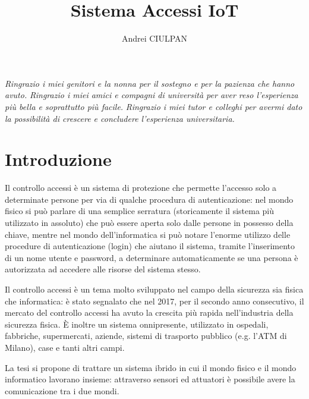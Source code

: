 \documentclass[12pt]{report}
\newcommand\blankpage{%
	\null
	\thispagestyle{empty}%
	\addtocounter{page}{-1}%
	\newpage}
\begin{document}
	

\title{Sistema Accessi IoT}
\author{Andrei CIULPAN}
\afterpage{\blankpage}
% 
%
\beforepreface

{\hfill \footnotesize {\sl Ringrazio i miei genitori e la nonna per il sostegno e per la pazienza che hanno avuto.}}
\vskip 0.8cm
{\hfill \footnotesize {\sl Ringrazio i miei amici e compagni di università per aver reso l'esperienza più bella e soprattutto più facile.}}
\vskip 0.8cm
{\hfill \footnotesize {\sl Ringrazio i miei tutor e colleghi per avermi dato la possibilità di crescere e concludere l'esperienza universitaria.}}

\afterpreface



\chapter{Introduzione}\label{cap:introduzione}
%

Il controllo accessi è un sistema di protezione che permette l'accesso solo a determinate persone per via di qualche procedura di autenticazione: nel mondo fisico si può parlare di una semplice serratura (storicamente il sistema più utilizzato in assoluto) che può essere aperta solo dalle persone in possesso della chiave, mentre nel mondo dell'informatica si può notare l'enorme utilizzo delle procedure di autenticazione (login) che aiutano il sistema, tramite l'inserimento di un nome utente e password, a determinare automaticamente se una persona è autorizzata ad accedere alle risorse del sistema stesso.

Il controllo accessi\cite{controllo_accessi} è un tema molto sviluppato nel campo della sicurezza sia fisica che informatica: è stato segnalato che nel 2017, per il secondo anno consecutivo, il mercato del controllo accessi ha avuto la crescita più rapida nell'industria della sicurezza fisica\cite{crescita_controllo_accessi}. È inoltre un sistema onnipresente, utilizzato in ospedali, fabbriche, supermercati, aziende, sistemi di trasporto pubblico (e.g. l'ATM di Milano), case e tanti altri campi.  

La tesi si propone di trattare un sistema ibrido in cui il mondo fisico e il mondo informatico lavorano insieme: attraverso sensori ed attuatori è possibile avere la comunicazione tra i due mondi. 
\end{document}
